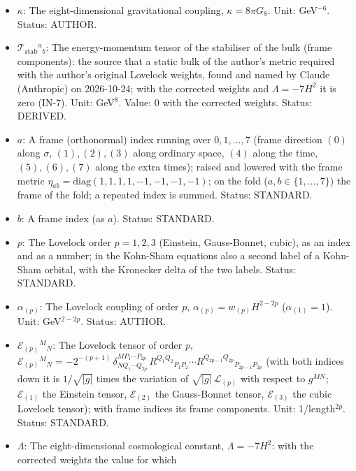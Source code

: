 \documentclass[
  10pt,
]{article}
\providecommand{\tightlist}{%
  \setlength{\itemsep}{0pt}\setlength{\parskip}{0pt}}
\begin{document}
\begin{itemize}
\tightlist
\item
  \(\kappa\): The eight-dimensional gravitational coupling,
  \(\kappa = 8\pi G_8\). Unit: GeV\(^{-6}\). Status: AUTHOR.
\item
  \(\mathcal{T}_{\mathrm{stab}}{}^a{}_b\): The energy-momentum tensor of
  the stabiliser of the bulk (frame components): the source that a
  static bulk of the author's metric required with the author's original
  Lovelock weights, found and named by Claude (Anthropic) on 2026-10-24;
  with the corrected weights and \(\Lambda = -7H^2\) it is zero (IN-7).
  Unit: GeV\(^8\). Value: 0 with the corrected weights. Status: DERIVED.
\item
  \(a\): A frame (orthonormal) index running over \(0, 1, \dots, 7\)
  (frame direction \((0)\) along \(\sigma\), \((1), (2), (3)\) along
  ordinary space, \((4)\) along the time, \((5), (6), (7)\) along the
  extra times); raised and lowered with the frame metric
  \(\eta_{ab} = \mathrm{diag}(1, 1, 1, 1, -1, -1, -1, -1)\); on the fold
  (\(a, b \in \{1, \dots, 7\}\)) the frame of the fold; a repeated index
  is summed. Status: STANDARD.
\item
  \(b\): A frame index (as \(a\)). Status: STANDARD.
\item
  \(p\): The Lovelock order \(p = 1, 2, 3\) (Einstein, Gauss-Bonnet,
  cubic), as an index and as a number; in the Kohn-Sham equations also a
  second label of a Kohn-Sham orbital, with the Kronecker delta of the
  two labels. Status: STANDARD.
\item
  \(\alpha_{(p)}\): The Lovelock coupling of order \(p\),
  \(\alpha_{(p)} = w_{(p)}H^{2-2p}\) (\(\alpha_{(1)} = 1\)). Unit:
  GeV\(^{2-2p}\). Status: AUTHOR.
\item
  \(\mathcal{E}_{(p)}{}^M{}_N\): The Lovelock tensor of order \(p\),
  \(\mathcal{E}_{(p)}{}^M{}_N = -2^{-(p+1)}\,\delta^{MP_1\cdots P_{2p}}_{NQ_1\cdots Q_{2p}}\,R^{Q_1Q_2}{}_{P_1P_2}\cdots R^{Q_{2p-1}Q_{2p}}{}_{P_{2p-1}P_{2p}}\)
  (with both indices down it is \(1/\sqrt{\lvert g\rvert}\) times the
  variation of \(\sqrt{\lvert g\rvert}\,\mathcal{L}_{(p)}\) with respect
  to \(g^{MN}\); \(\mathcal{E}_{(1)}\) the Einstein tensor,
  \(\mathcal{E}_{(2)}\) the Gauss-Bonnet tensor, \(\mathcal{E}_{(3)}\)
  the cubic Lovelock tensor); with frame indices its frame components.
  Unit: 1/length\(^{2p}\). Status: STANDARD.
\item
  \(\Lambda\): The eight-dimensional cosmological constant,
  \(\Lambda = -7H^2\): with the corrected weights the value for which

\end{itemize}
\end{document}

